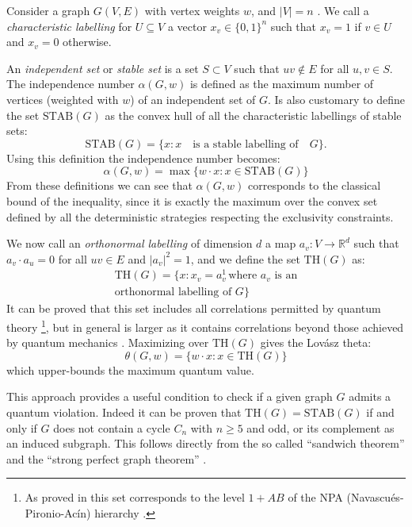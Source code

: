 \documentclass[letterpaper]{article}
\newcommand{\Real}{\mathbb{R}}
\newcommand{\STAB}{\mathrm{STAB}}
\renewcommand{\TH}{\mathrm{TH}}
\begin{document}
Consider a graph $G(V,E)$ with vertex weights $w$, and $|V| = n$ .
We call a \emph{characteristic labelling} for $U \subseteq V$ a vector $x_v \in
\{0,1\}^n$ such that $x_v = 1$ if $v \in U$ and $x_v = 0$ otherwise.

An \emph{independent set} or \emph{stable set} is a set
$S \subset V$ such that $uv \notin E$ for all $u,v \in S$.
The independence number $\alpha(G, w)$ is defined as the maximum number of vertices (weighted with $w$) of an independent set of $G$. Is also customary to define the set $\STAB(G)$ as the convex hull of all the
characteristic labellings of stable sets:
\begin{equation} 
    \STAB(G) = \{x : x \quad \text{is a stable labelling of}\quad G \}.
    \label{eq:stab}
\end{equation}
Using this definition the independence number becomes:
\begin{equation}
    \alpha(G,w) = \max\{w\cdot x: x \in \STAB(G)\}
    \label{eq:alphastab}
\end{equation}
From these definitions we can see that $\alpha(G,w)$ corresponds to the classical bound of the inequality, since it is exactly the maximum over the convex set defined by all the deterministic strategies respecting the exclusivity constraints.

We now call an \emph{orthonormal labelling} of dimension $d$ a map
$a_v:V\rightarrow\Real^d$ such that $a_v \cdot a_u = 0$ for all $uv \in E$ and
$|a_v|^2 = 1$, and we define the set $\TH(G)$ as:
\begin{multline}
    \TH(G) = \{x: x_v = a_v^1 \, \text{where $a_v$ is an} \\ \text{orthonormal labelling of $G$}\}
    \label{eq:thbody}
\end{multline}
It can be proved that this set includes all correlations permitted by quantum theory \footnote{As proved in \cite{acin2015} this set corresponds to the level $1+AB$ of the
NPA (Navascués-Pironio-Acín) hierarchy \cite{npa2008}.}, but in general is larger as it contains correlations beyond those achieved by quantum mechanics \cite{almostquantum2015}.
Maximizing over $\TH(G)$ gives the Lovász theta:
\begin{equation}
    \theta(G,w) = \{w\cdot x : x \in \TH(G)\}
    \label{eq:lovasztheta}
\end{equation}
which upper-bounds the maximum quantum value.

This approach provides a useful condition to check if a given graph $G$ admits a quantum violation. Indeed it can be proven that $\TH(G) = \STAB(G)$ if and only if $G$ does not contain a cycle $C_n$ with $n \ge 5$ and odd, or its complement as an induced subgraph. This follows directly from the so called ``sandwich theorem'' and the ``strong
perfect graph theorem'' \cite{knuth}.
\end{document}
